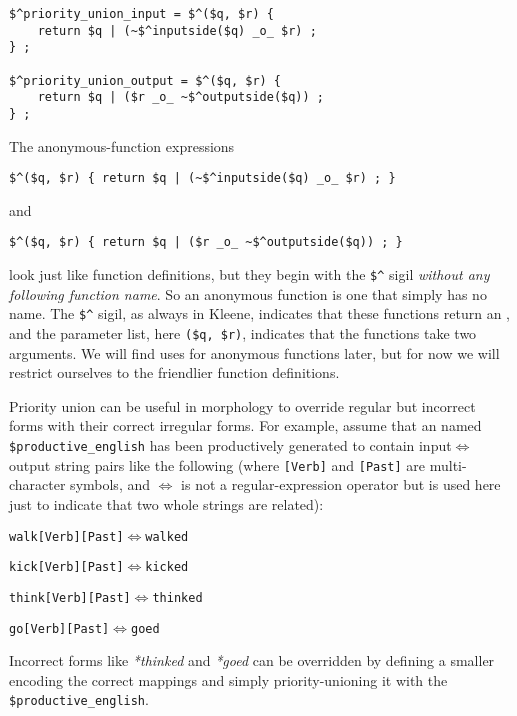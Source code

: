 \begin{Verbatim}
$^priority_union_input = $^($q, $r) {
	return $q | (~$^inputside($q) _o_ $r) ;
} ;

$^priority_union_output = $^($q, $r) {
	return $q | ($r _o_ ~$^outputside($q)) ;
} ;
\end{Verbatim}

\noindent
The anonymous-function expressions

\begin{Verbatim}
$^($q, $r) { return $q | (~$^inputside($q) _o_ $r) ; }
\end{Verbatim}

\noindent
and

\begin{Verbatim}
$^($q, $r) { return $q | ($r _o_ ~$^outputside($q)) ; }
\end{Verbatim}


\noindent
look just like function definitions, but they begin with the \verb!$^! sigil \emph{without any
following function name}. So an anonymous function is one that simply has no name.  The \verb!$^! sigil, as always in Kleene,
indicates that these functions return an \fsm{}, and the
parameter list, here \verb!($q, $r)!, indicates that the functions take two \fsm{} arguments.  We will find
uses for anonymous functions later, but for now we will restrict ourselves to the friendlier function
definitions.

Priority union can be useful in morphology to override regular but incorrect
forms with their correct irregular forms.  For example, assume that
an \fsm{} named \verb!$productive_english! has been productively generated to contain
input$\Longleftrightarrow$output
string pairs like the following (where \verb![Verb]! and \verb![Past]! are
multi-character symbols, and $\Longleftrightarrow$ is not a regular-expression
operator but is used here just to indicate that two whole strings are related):

\begin{alltt}
walk[Verb][Past] \(\Longleftrightarrow\) walked

kick[Verb][Past] \(\Longleftrightarrow\) kicked

think[Verb][Past] \(\Longleftrightarrow\) thinked

go[Verb][Past] \(\Longleftrightarrow\) goed
\end{alltt}

\noindent
Incorrect forms like \emph{*thinked} and \emph{*goed} can be overridden by 
defining a
smaller \fsm{} encoding the correct mappings and simply priority-unioning it with
the \fsm{} \verb!$productive_english!.

